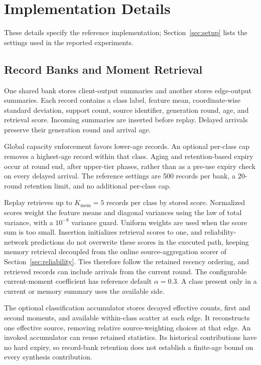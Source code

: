 \section{Implementation Details}
\label{supp:implementation}

These details specify the reference implementation; Section~\ref{sec:setup} lists the settings used in the reported experiments.

\subsection{Record Banks and Moment Retrieval}

One shared bank stores client-output summaries and another stores edge-output summaries. Each record contains a class label, feature mean, coordinate-wise standard deviation, support count, source identifier, generation round, age, and retrieval score. Incoming summaries are inserted before replay. Delayed arrivals preserve their generation round and arrival age.

Global capacity enforcement favors lower-age records. An optional per-class cap removes a highest-age record within that class. Aging and retention-based expiry occur at round end, after upper-tier phases, rather than as a pre-use expiry check on every delayed arrival. The reference settings are 500 records per bank, a 20-round retention limit, and no additional per-class cap.

Replay retrieves up to $K_{\mathrm{mem}}=5$ records per class by stored score. Normalized scores weight the feature means and diagonal variances using the law of total variance, with a $10^{-8}$ variance guard. Uniform weights are used when the score sum is too small. Insertion initializes retrieval scores to one, and reliability-network predictions do not overwrite these scores in the executed path, keeping memory retrieval decoupled from the online source-aggregation scorer of Section~\ref{sec:reliability}. Ties therefore follow the retained recency ordering, and retrieved records can include arrivals from the current round. The configurable current-moment coefficient has reference default $\alpha=0.3$. A class present only in a current or memory summary uses the available side.

The optional classification accumulator stores decayed effective counts, first and second moments, and available within-class scatter at each edge. It reconstructs one effective source, removing relative source-weighting choices at that edge. An invoked accumulator can reuse retained statistics. Its historical contributions have no hard expiry, so record-bank retention does not establish a finite-age bound on every synthesis contribution.

